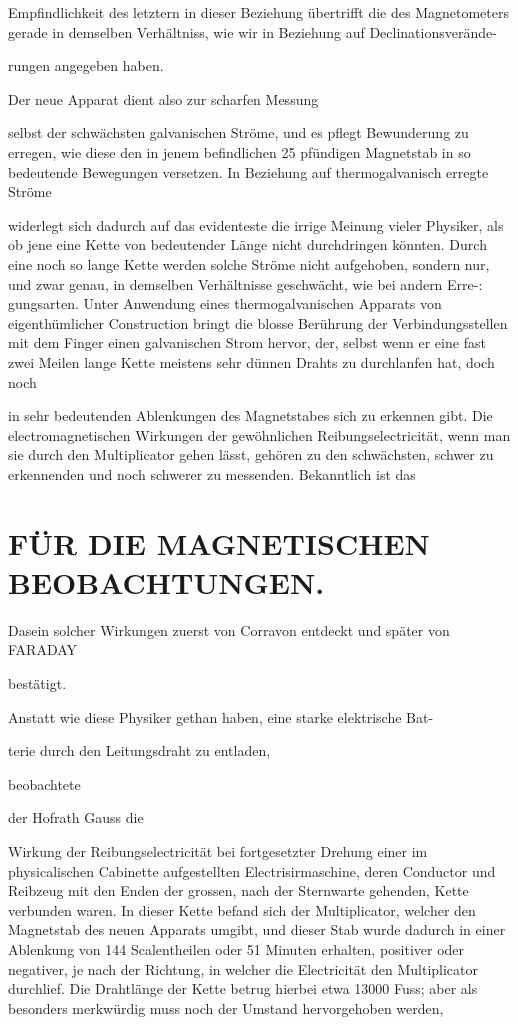 \documentclass[12pt,a4paper]{article}
\begin{document}
Empfindlichkeit des letztern in dieser Beziehung übertrifft die des Magnetometers gerade in demselben Verhältniss, wie wir in Beziehung auf Declinationsverände-

rungen angegeben haben.

Der neue Apparat dient also zur scharfen Messung

selbst der schwächsten galvanischen Ströme, und es pflegt Bewunderung zu erregen, wie diese den in jenem befindlichen 25 pfündigen Magnetstab in so bedeutende Bewegungen versetzen. In Beziehung auf thermogalvanisch erregte Ströme

widerlegt sich dadurch auf das evidenteste die irrige Meinung vieler Physiker, als ob jene eine Kette von bedeutender Länge nicht durchdringen könnten. Durch eine noch so lange Kette werden solche Ströme nicht aufgehoben, sondern nur, und zwar genau, in demselben Verhältnisse geschwächt, wie bei andern Erre-: gungsarten. Unter Anwendung eines thermogalvanischen Apparats von eigenthümlicher Construction bringt die blosse Berührung der Verbindungsstellen mit dem Finger einen galvanischen Strom hervor, der, selbst wenn er eine fast zwei Meilen lange Kette meistens sehr dünnen Drahts zu durchlanfen hat, doch noch

in sehr bedeutenden Ablenkungen des Magnetstabes sich zu erkennen gibt. Die electromagnetischen Wirkungen der gewöhnlichen Reibungselectricität, wenn man sie durch den Multiplicator gehen lässt, gehören zu den schwächsten, schwer zu erkennenden und noch schwerer zu messenden. Bekanntlich ist das

\section*{FÜR DIE MAGNETISCHEN BEOBACHTUNGEN.}
Dasein solcher Wirkungen zuerst von Corravon entdeckt und später von FARADAY

bestätigt.

Anstatt wie diese Physiker gethan haben, eine starke elektrische Bat-

terie durch den Leitungsdraht zu entladen,

beobachtete

der Hofrath Gauss die

Wirkung der Reibungselectricität bei fortgesetzter Drehung einer im physicalischen Cabinette aufgestellten Electrisirmaschine, deren Conductor und Reibzeug mit den Enden der grossen, nach der Sternwarte gehenden, Kette verbunden waren. In dieser Kette befand sich der Multiplicator, welcher den Magnetstab des neuen Apparats umgibt, und dieser Stab wurde dadurch in einer Ablenkung von 144 Scalentheilen oder 51 Minuten erhalten, positiver oder negativer, je nach der Richtung, in welcher die Electricität den Multiplicator durchlief. Die Drahtlänge der Kette betrug hierbei etwa 13000 Fuss; aber als besonders merkwürdig muss noch der Umstand hervorgehoben werden,
\end{document}
